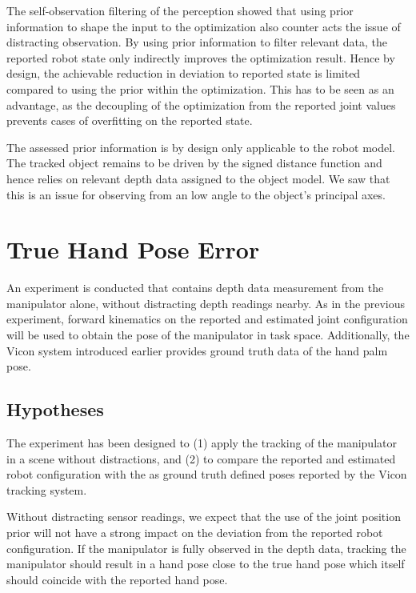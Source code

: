 The self-observation filtering of the perception showed that using prior information to shape the input to the optimization also counter acts the issue of distracting observation. By using prior information to filter relevant data, the reported robot state only indirectly improves the optimization result. Hence by design, the achievable reduction in deviation to reported state is limited compared to using the prior within the optimization. This has to be seen as an advantage, as the decoupling of the optimization from the reported joint values prevents cases of overfitting on the reported state.

The assessed prior information is by design only applicable to the robot model. The tracked object remains to be driven by the signed distance function and hence relies on relevant depth data assigned to the object model. We saw that this is an issue for observing from an low angle to the object's principal axes.


\section{True Hand Pose Error}
\label{sec:hand_pose_error}

An experiment is conducted that contains depth data measurement from the manipulator alone, without distracting depth readings nearby. As in the previous experiment, forward kinematics on the reported and estimated joint configuration will be used to obtain the pose of the manipulator in task space. Additionally, the Vicon system introduced earlier provides ground truth data of the hand palm pose.


\subsection{Hypotheses}

The experiment has been designed to (1) apply the tracking of the manipulator in a scene without distractions, and (2) to compare the reported and estimated robot configuration with the as ground truth defined poses reported by the Vicon tracking system.

Without distracting sensor readings, we expect that the use of the joint position prior will not have a strong impact on the deviation from the reported robot configuration. If the manipulator is fully observed in the depth data, tracking the manipulator should result in a hand pose close to the true hand pose which itself should coincide with the reported hand pose.

